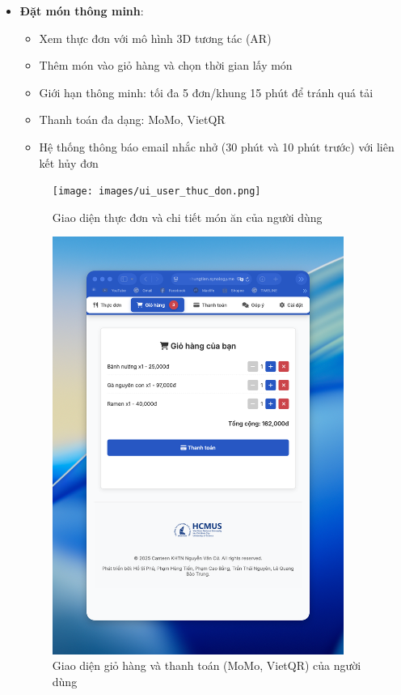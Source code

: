 \documentclass[12pt,a4paper]{article}
\begin{document}
\begin{itemize}[leftmargin=1cm]
    \item \textbf{Đặt món thông minh}:
        \begin{itemize}[leftmargin=0.5cm]
            \item Xem thực đơn với mô hình 3D tương tác (AR)
            \item Thêm món vào giỏ hàng và chọn thời gian lấy món
            \item Giới hạn thông minh: tối đa 5 đơn/khung 15 phút để tránh quá tải
            \item Thanh toán đa dạng: MoMo, VietQR
            \item Hệ thống thông báo email nhắc nhở (30 phút và 10 phút trước) với liên kết hủy đơn
        \end{itemize}
\begin{figure}[H]
    \centering
    \texttt{[image: images/ui\_user\_thuc\_don.png]} %
    \caption{Giao diện thực đơn và chi tiết món ăn của người dùng}
    \label{fig:ui_user_menu}
\end{figure}
\begin{figure}[H]
    \centering
    \includegraphics[width=0.9\textwidth]{images/ui_user_gio_hang_thanh_toan.png} %
    \caption{Giao diện giỏ hàng và thanh toán (MoMo, VietQR) của người dùng}
    \label{fig:ui_user_cart_payment}
\end{figure}


\end{itemize}
\end{document}
